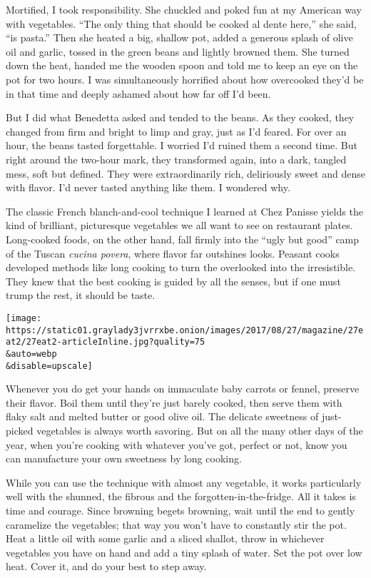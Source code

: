 Mortified, I took responsibility. She chuckled and poked fun at my
American way with vegetables. ``The only thing that should be cooked al
dente here,'' she said, ``is pasta.'' Then she heated a big, shallow
pot, added a generous splash of olive oil and garlic, tossed in the
green beans and lightly browned them. She turned down the heat, handed
me the wooden spoon and told me to keep an eye on the pot for two hours.
I was simultaneously horrified about how overcooked they'd be in that
time and deeply ashamed about how far off I'd been.

But I did what Benedetta asked and tended to the beans. As they cooked,
they changed from firm and bright to limp and gray, just as I'd feared.
For over an hour, the beans tasted forgettable. I worried I'd ruined
them a second time. But right around the two-hour mark, they transformed
again, into a dark, tangled mess, soft but defined. They were
extraordinarily rich, deliriously sweet and dense with flavor. I'd never
tasted anything like them. I wondered why.

The classic French blanch-and-cool technique I learned at Chez Panisse
yields the kind of brilliant, picturesque vegetables we all want to see
on restaurant plates. Long-cooked foods, on the other hand, fall firmly
into the ``ugly but good'' camp of the Tuscan \emph{cucina povera},
where flavor far outshines looks. Peasant cooks developed methods like
long cooking to turn the overlooked into the irresistible. They knew
that the best cooking is guided by all the senses, but if one must trump
the rest, it should be taste.

\texttt{[image: https://static01.graylady3jvrrxbe.onion/images/2017/08/27/magazine/27eat2/27eat2-articleInline.jpg?quality=75\\\&auto=webp\\\&disable=upscale]}

Whenever you do get your hands on immaculate baby carrots or fennel,
preserve their flavor. Boil them until they're just barely cooked, then
serve them with flaky salt and melted butter or good olive oil. The
delicate sweetness of just-picked vegetables is always worth savoring.
But on all the many other days of the year, when you're cooking with
whatever you've got, perfect or not, know you can manufacture your own
sweetness by long cooking.

While you can use the technique with almost any vegetable, it works
particularly well with the shunned, the fibrous and the
forgotten-in-the-fridge. All it takes is time and courage. Since
browning begets browning, wait until the end to gently caramelize the
vegetables; that way you won't have to constantly stir the pot. Heat a
little oil with some garlic and a sliced shallot, throw in whichever
vegetables you have on hand and add a tiny splash of water. Set the pot
over low heat. Cover it, and do your best to step away.

